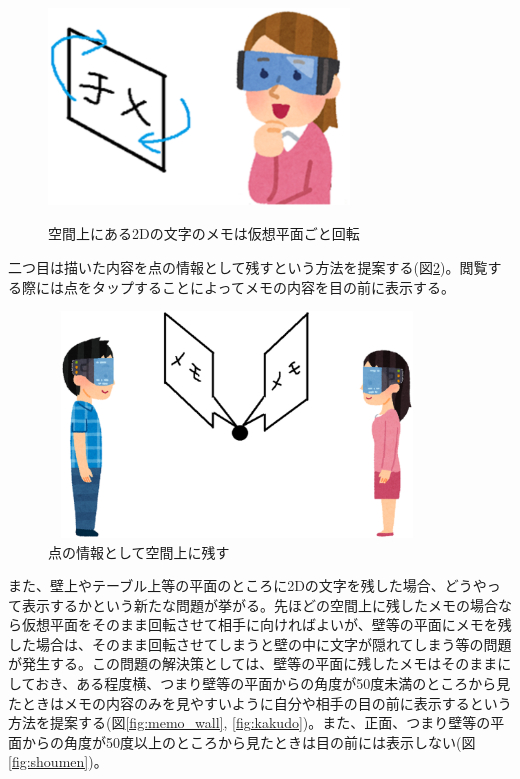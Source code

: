 \documentclass[11pt,a4j, titlepage]{jarticle} %
\begin{document}
\begin{figure}[H]
  \begin{center}
    \includegraphics[clip,height=6.0cm,width=8.0cm]{./memo_kaiten.eps}
    \caption{空間上にある2Dの文字のメモは仮想平面ごと回転}
    \label{fig:memo_kaiten}
  \end{center}
\end{figure}

二つ目は描いた内容を点の情報として残すという方法を提案する(図\ref{fig:memo_ten})。閲覧する際には点をタップすることによってメモの内容を目の前に表示する。

\begin{figure}[H]
  \begin{center}
    \includegraphics[clip,height=6.0cm,width=10.0cm]{./memo_ten.eps}
    \caption{点の情報として空間上に残す}
    \label{fig:memo_ten}
  \end{center}
\end{figure}

また、壁上やテーブル上等の平面のところに2Dの文字を残した場合、どうやって表示するかという新たな問題が挙がる。先ほどの空間上に残したメモの場合なら仮想平面をそのまま回転させて相手に向ければよいが、壁等の平面にメモを残した場合は、そのまま回転させてしまうと壁の中に文字が隠れてしまう等の問題が発生する。この問題の解決策としては、壁等の平面に残したメモはそのままにしておき、ある程度横、つまり壁等の平面からの角度が50度未満のところから見たときはメモの内容のみを見やすいように自分や相手の目の前に表示するという方法を提案する(図\ref{fig:memo_wall}, \ref{fig:kakudo})。また、正面、つまり壁等の平面からの角度が50度以上のところから見たときは目の前には表示しない(図\ref{fig:shoumen})。
\end{document}
